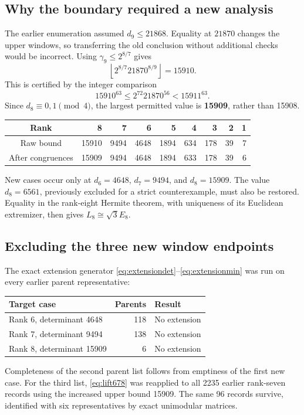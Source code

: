 \documentclass[11pt,a4paper]{article}
\theoremstyle{remark}\newtheorem{remark}[theorem]{Remark}
\begin{document}
\subsection{Why the boundary required a new analysis}

The earlier enumeration assumed $d_9\le21868$. Equality at $21870$ changes the upper windows, so transferring the old conclusion without additional checks would be incorrect. Using $\gamma_9\le2^{8/7}$ gives
\[
\left\lfloor2^{8/7}21870^{8/9}\right\rfloor=15910.
\]
This is certified by the integer comparison
\[
15910^{63}\le2^{72}21870^{56}<15911^{63}.
\]
Since $d_8\equiv0,1\pmod4$, the largest permitted value is \textbf{15909}, rather than 15908.

\begin{center}
\begin{tabular}{c*{8}{r}}
\toprule
Rank &8&7&6&5&4&3&2&1\\\midrule
Raw bound &15910&9494&4648&1894&634&178&39&7\\
After congruences &15909&9494&4648&1894&633&178&39&6\\
\bottomrule
\end{tabular}
\end{center}

New cases occur only at $d_6=4648$, $d_7=9494$, and $d_8=15909$. The value $d_8=6561$, previously excluded for a strict counterexample, must also be restored. Equality in the rank-eight Hermite theorem, with uniqueness of its Euclidean extremizer, then gives $L_8\cong\sqrt3E_8$.

\subsection{Excluding the three new window endpoints}

The exact extension generator \eqref{eq:extensiondet}--\eqref{eq:extensionmin} was run on every earlier parent representative:
\begin{center}
\begin{tabular}{lrl}
\toprule
Target case & Parents & Result\\\midrule
Rank 6, determinant 4648 &118&No extension\\
Rank 7, determinant 9494 &138&No extension\\
Rank 8, determinant 15909 &6&No extension\\
\bottomrule
\end{tabular}
\end{center}
Completeness of the second parent list follows from emptiness of the first new case. For the third list, \eqref{eq:lift678} was reapplied to all 2235 earlier rank-seven records using the increased upper bound 15909. The same 96 records survive, identified with six representatives by exact unimodular matrices.
\end{document}
